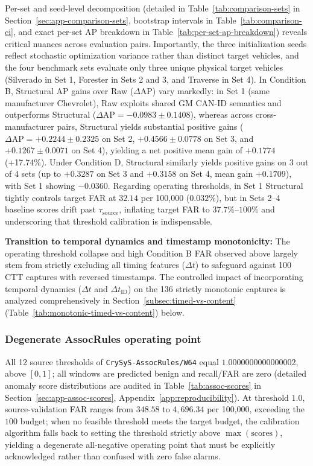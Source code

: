 \documentclass[12pt, a4paper, reqno, oneside]{book}
\DeclareRobustCommand{\code}[1]{\nolinkurl{#1}}
\begin{document}
Per-set and seed-level decomposition (detailed in Table~\ref{tab:comparison-sets} in Section~\ref{sec:app-comparison-sets}, bootstrap intervals in Table~\ref{tab:comparison-ci}, and exact per-set AP breakdown in Table~\ref{tab:per-set-ap-breakdown}) reveals critical nuances across evaluation pairs. Importantly, the three initialization seeds reflect stochastic optimization variance rather than distinct target vehicles, and the four benchmark sets evaluate only three unique physical target vehicles (Silverado in Set 1, Forester in Sets 2 and 3, and Traverse in Set 4). In Condition B, Structural AP gains over Raw ($\Delta\text{AP}$) vary markedly: in Set 1 (same manufacturer Chevrolet), Raw exploits shared GM CAN-ID semantics and outperforms Structural ($\Delta\text{AP} = -0.0983 \pm 0.1408$), whereas across cross-manufacturer pairs, Structural yields substantial positive gains ($\Delta\text{AP} = +0.2244 \pm 0.2325$ on Set 2, $+0.4566 \pm 0.0778$ on Set 3, and $+0.1267 \pm 0.0071$ on Set 4), yielding a net positive mean gain of $+0.1774$ (+17.74\%). Under Condition D, Structural similarly yields positive gains on 3 out of 4 sets (up to $+0.3287$ on Set 3 and $+0.3158$ on Set 4, mean gain $+0.1709$), with Set 1 showing $-0.0360$. Regarding operating thresholds, in Set 1 Structural tightly controls target FAR at $32.14$ per 100,000 ($0.032\%$), but in Sets 2--4 baseline scores drift past $\tau_{\text{source}}$, inflating target FAR to $37.7\%\text{--}100\%$ and underscoring that threshold calibration is indispensable.

\noindent\noindent\textbf{Transition to temporal dynamics and timestamp monotonicity:} The operating threshold collapse and high Condition B FAR observed above largely stem from strictly excluding all timing features ($\Delta t$) to safeguard against 100 CTT captures with reversed timestamps. The controlled impact of incorporating temporal dynamics ($\Delta t$ and $\Delta t_{\text{ID}}$) on the 136 strictly monotonic captures is analyzed comprehensively in Section~\ref{subsec:timed-vs-content} (Table~\ref{tab:monotonic-timed-vs-content}) below.

\subsubsection{Degenerate AssocRules operating point}\label{subsec:assoc-degenerate}
All 12 source thresholds of \code{CrySyS-AssocRules/W64} equal $1.0000000000000002$, above $[0,1]$; all windows are predicted benign and recall/FAR are zero (detailed anomaly score distributions are audited in Table~\ref{tab:assoc-scores} in Section~\ref{sec:app-assoc-scores}, Appendix~\ref{app:reproducibility}). At threshold $1.0$, source-validation FAR ranges from $348.58$ to $4,696.34$ per 100,000, exceeding the $100$ budget; when no feasible threshold meets the target budget, the calibration algorithm falls back to setting the threshold strictly above $\max(\text{scores})$, yielding a degenerate all-negative operating point that must be explicitly acknowledged rather than confused with zero false alarms.
\end{document}
